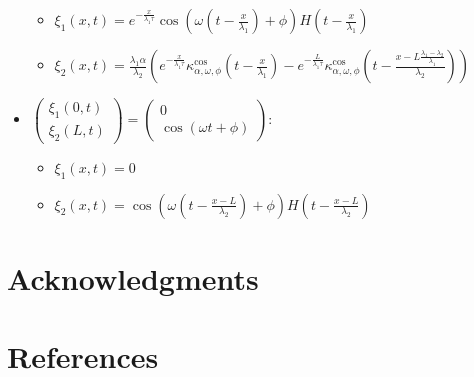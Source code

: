 \documentclass[preprint]{elsarticle}
\begin{document}
\begin{itemize}
\begin{itemize}
\item $\xi_{1}\left(x,t\right)=e^{-\frac{x}{\lambda_{1}\tau}}\cos\left(\omega\left(t-\frac{x}{\lambda_{1}}\right)+\phi\right)H\left(t-\frac{x}{\lambda_{1}}\right)$
\item $\xi_{2}\left(x,t\right)=\frac{\lambda_{1}\alpha}{\lambda_{2}}\left(e^{-\frac{x}{\lambda_{1}\tau}}\kappa_{\alpha,\omega,\phi}^{\text{cos}}\left(t-\frac{x}{\lambda_{1}}\right)-e^{-\frac{L}{\lambda_{1}\tau}}\kappa_{\alpha,\omega,\phi}^{\text{cos}}\left(t-\frac{x-L\frac{\lambda_{1}-\lambda_{2}}{\lambda_{1}}}{\lambda_{2}}\right)\right)$
\end{itemize}
\item $\left(\begin{array}{c}
\xi_{1}\left(0,t\right)\\
\xi_{2}\left(L,t\right)
\end{array}\right)=\left(\begin{array}{c}
0\\
\cos\left(\omega t+\phi\right)
\end{array}\right)$:

\begin{itemize}
\item $\xi_{1}\left(x,t\right)=0$
\item $\xi_{2}\left(x,t\right)=\cos\left(\omega\left(t-\frac{x-L}{\lambda_{2}}\right)+\phi\right)H\left(t-\frac{x-L}{\lambda_{2}}\right)$\end{itemize}
\end{itemize}

\section*{Acknowledgments}


\section*{References}


\end{document}

